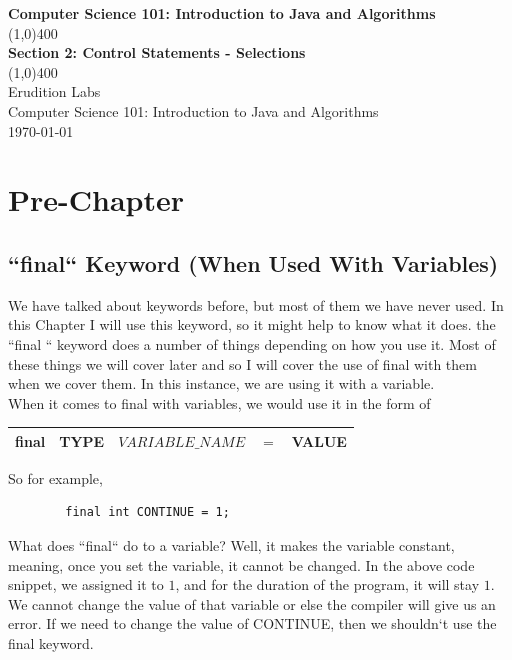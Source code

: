 \documentclass[11]{article}
\begin{document}
\begin{titlepage}
\begin{center}
\vspace{1cm}
\Large{\textbf{Computer Science 101: Introduction to Java and Algorithms}}\\
\vfill
\line(1,0){400}\\
\huge{\textbf{Section 2: Control Statements - Selections}}\\
\line(1,0){400}\\
\vfill
Erudition Labs\\
Computer Science 101: Introduction to Java and Algorithms\\
\today\\
\end{center}
\end{titlepage}

\tableofcontents
\thispagestyle{empty}
\clearpage
\setcounter{page}{1}

\section{Pre-Chapter}
\subsection{``final`` Keyword (When Used With Variables)}
\label{sec:final}
We have talked about keywords before, but most of them we have never used. In this Chapter I will use this keyword, so it might help to know what it does. the ``final	`` keyword does a number of things depending on how you use it. Most of these things we will cover later and so I will cover the use of final with them when we cover them. In this instance, we are using it with a variable.\\

When it comes to final with variables, we would use it in the form of
\begin{center}
  \begin{tabular}{ | c | c | c | c | c |}
    \hline
    final &TYPE & $VARIABLE\_NAME$ & $=$ & VALUE  \\
    \hline
  \end{tabular}
\end{center}

So for example,
\begin{lstlisting}
        final int CONTINUE = 1;
\end{lstlisting}

What does ``final`` do to a variable? Well, it makes the variable constant, meaning, once you set the variable, it cannot be changed. In the above code snippet, we assigned it to $1$, and for the duration of the program, it will stay $1$. We cannot change the value of that variable or else the compiler will give us an error. If we need to change the value of CONTINUE, then we shouldn`t use the final keyword.
\end{document}
